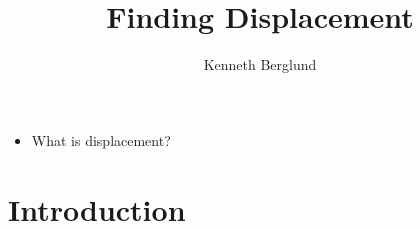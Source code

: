 \documentclass[nooutcomes]{ximera}
\author{Kenneth Berglund}
\title{Finding Displacement}
\begin{document}
\begin{abstract}
  
\end{abstract}
\maketitle

\begin{motivatingQuestions}\begin{itemize}
	\item What is displacement?
\end{itemize}\end{motivatingQuestions}

\section{Introduction}
\end{document}
